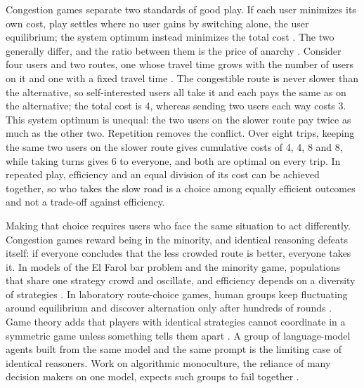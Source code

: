 \documentclass[11pt]{article}
\begin{document}
Congestion games separate two standards of good play. If each user minimizes its own cost, play settles where no user gains by switching alone, the user equilibrium; the system optimum instead minimizes the total cost \citep{wardrop1952_road}. The two generally differ, and the ratio between them is the price of anarchy \citep{roughgarden2002_selfish_routing}. Consider four users and two routes, one whose travel time grows with the number of users on it and one with a fixed travel time \citep{pigou1920_welfare}. The congestible route is never slower than the alternative, so self-interested users all take it and each pays the same as on the alternative; the total cost is 4, whereas sending two users each way costs 3. This system optimum is unequal: the two users on the slower route pay twice as much as the other two. Repetition removes the conflict. Over eight trips, keeping the same two users on the slower route gives cumulative costs of 4, 4, 8 and 8, while taking turns gives 6 to everyone, and both are optimal on every trip. In repeated play, efficiency and an equal division of its cost can be achieved together, so who takes the slow road is a choice among equally efficient outcomes and not a trade-off against efficiency.

Making that choice requires users who face the same situation to act differently. Congestion games reward being in the minority, and identical reasoning defeats itself: if everyone concludes that the less crowded route is better, everyone takes it. In models of the El Farol bar problem and the minority game, populations that share one strategy crowd and oscillate, and efficiency depends on a diversity of strategies \citep{arthur1994_inductive,challet1997_minority}. In laboratory route-choice games, human groups keep fluctuating around equilibrium \citep{selten2007_commuters} and discover alternation only after hundreds of rounds \citep{helbing2005_turn_taking}. Game theory adds that players with identical strategies cannot coordinate in a symmetric game unless something tells them apart \citep{crawford1990_learning}. A group of language-model agents built from the same model and the same prompt is the limiting case of identical reasoners. Work on algorithmic monoculture, the reliance of many decision makers on one model, expects such groups to fail together \citep{kleinberg2021_monoculture,bommasani2022_picking}.
\end{document}
